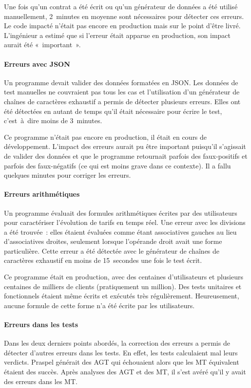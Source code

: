 Une fois qu'un contrat a été écrit ou qu'un générateur de données a été utilisé
manuellement, 2~minutes en moyenne sont nécessaires pour détecter ces erreurs.
Le code impacté n'était pas encore en production mais sur le point d'être livré.
L'ingénieur a estimé que si l'erreur était apparue en production, son impact
aurait été «~important~».

\paragraph{Erreurs avec JSON} Un programme devait valider des données formatées
en JSON. Les données de test manuelles ne couvraient pas tous les cas et
l'utilisation d'un générateur de chaînes de caractères exhaustif a permis de
détecter plusieurs erreurs. Elles ont été détectées en autant de temps qu'il
était nécessaire pour écrire le test, c'est~à~dire moins de 3~minutes. 

Ce programme n'était pas encore en production, il était en cours de
développement. L'impact des erreurs aurait pu être important puisqu'il
s'agissait de valider des données et que le programme retournait parfois des
faux-positifs et parfois des faux-négatifs (ce qui est moins grave dans ce
contexte). Il a fallu quelques minutes pour corriger les erreurs.

\paragraph{Erreurs arithmétiques} Un programme évaluait des formules
arithmétiques écrites par des utilisateurs pour caractériser l'évolution de
tarifs en temps réel. Une erreur avec les divisions a été trouvée~: elles
étaient évaluées comme étant associatives gauches au lieu d'associatives
droites, seulement lorsque l'opérande droit avait une forme particulière. Cette
erreur a été détectée avec le générateur de chaînes de caractères exhaustif en
moins de 15~secondes une fois le test écrit.

Ce programme était en production, avec des centaines d'utilisateurs et plusieurs
centaines de milliers de clients (pratiquement un million). Des tests unitaires
et fonctionnels étaient même écrits et exécutés très régulièrement.
Heureusement, aucune formule de cette forme n'a été écrite par les utilisateurs.

\paragraph{Erreurs dans les tests} Dans les deux derniers points abordés, la
correction des erreurs a permis de détecter d'autres erreurs dans les tests. En
effet, les tests calculaient mal leurs verdicts. Praspel générait des AGT qui
échouaient alors que les MT équivalent étaient des succès. Après analyses des
AGT et des MT, il s'est avéré qu'il y avait des erreurs dans les MT.

